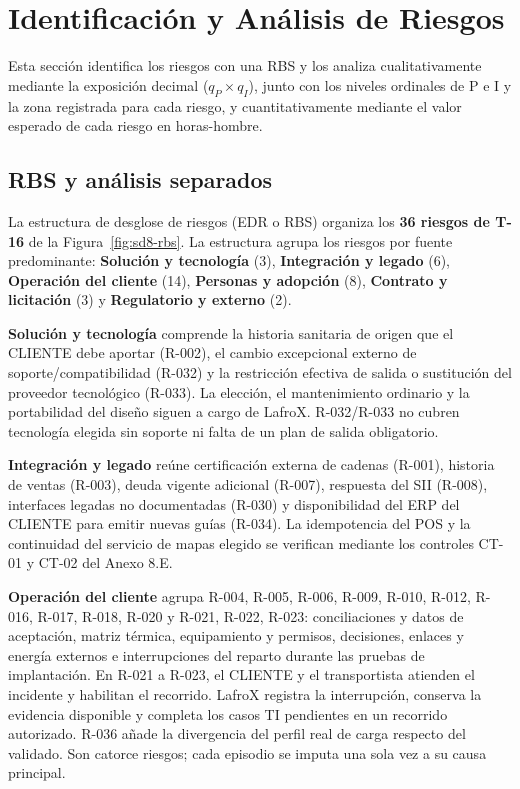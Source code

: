 \section{Identificación y Análisis de Riesgos}

Esta sección identifica los riesgos con una RBS y los analiza cualitativamente mediante la exposición decimal ($q_P\times q_I$), junto con los niveles ordinales de P e I y la zona registrada para cada riesgo, y cuantitativamente mediante el valor esperado de cada riesgo en horas-hombre.

\subsection{RBS y análisis separados}

La estructura de desglose de riesgos (EDR o RBS) organiza los \textbf{36 riesgos de T-16} de la Figura~\ref{fig:sd8-rbs}. La estructura agrupa los riesgos por fuente predominante: \textbf{Solución y tecnología} (3), \textbf{Integración y legado} (6), \textbf{Operación del cliente} (14), \textbf{Personas y adopción} (8), \textbf{Contrato y licitación} (3) y \textbf{Regulatorio y externo} (2).


\textbf{Solución y tecnología} comprende la historia sanitaria de origen que el CLIENTE debe aportar (R-002), el cambio excepcional externo de soporte/compatibilidad (R-032) y la restricción efectiva de salida o sustitución del proveedor tecnológico (R-033). La elección, el mantenimiento ordinario y la portabilidad del diseño siguen a cargo de LafroX. R-032/R-033 no cubren tecnología elegida sin soporte ni falta de un plan de salida obligatorio.

\textbf{Integración y legado} reúne certificación externa de cadenas (R-001), historia de ventas (R-003), deuda vigente adicional (R-007), respuesta del SII (R-008), interfaces legadas no documentadas (R-030) y disponibilidad del ERP del CLIENTE para emitir nuevas guías (R-034). La idempotencia del POS y la continuidad del servicio de mapas elegido se verifican mediante los controles CT-01 y CT-02 del Anexo 8.E.

\textbf{Operación del cliente} agrupa R-004, R-005, R-006, R-009, R-010, R-012, R-016, R-017, R-018, R-020 y R-021, R-022, R-023: conciliaciones y datos de aceptación, matriz térmica, equipamiento y permisos, decisiones, enlaces y energía externos e interrupciones del reparto durante las pruebas de implantación. En R-021 a R-023, el CLIENTE y el transportista atienden el incidente y habilitan el recorrido. LafroX registra la interrupción, conserva la evidencia disponible y completa los casos TI pendientes en un recorrido autorizado. R-036 añade la divergencia del perfil real de carga respecto del validado. Son catorce riesgos; cada episodio se imputa una sola vez a su causa principal.

